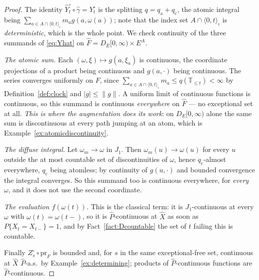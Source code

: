 \documentclass[11pt,a4paper]{article}
\theoremstyle{plain}
\theoremstyle{definition}
\theoremstyle{remark}
\newcommand{\T}{\mathbb{T}}                     %
\newcommand{\DE}{D_E[0,\infty)}
\begin{document}
\begin{proof}
  The identity $\hat{Y}^\circ_t \circ \hat\gamma = Y^\circ_t$ is the splitting
  $q = q_{\mathrm{a}} + q_{\mathrm{c}}$, the atomic integral being
  $\sum_{a \in A \cap \langle 0,t\rangle_\iota} m_a g(a,\omega(a))$; note that the
  index set $A \cap \langle 0,t\rangle_\iota$ is \emph{deterministic}, which is
  the whole point.  We check continuity of the three summands of
  \eqref{eq:Yhat} on $\hat{F} = \DE \times E^A$.

  \emph{The atomic sum.}  Each $(\omega,\xi) \mapsto g(a,\xi_a)$ is continuous, the
  coordinate projections of a product being continuous and $g(a,\cdot)$ being
  continuous.  The series converges uniformly on $\hat{F}$, since
  $\sum_{a \in A \cap \langle 0,t\rangle_\iota} m_a \leq q(\T_{\leq t}) < \infty$ by
  Definition~\ref{def:clock} and $|g| \leq \lVert g\rVert$.  A uniform limit of
  continuous functions is continuous, so this summand is continuous
  \emph{everywhere} on $\hat{F}$ --- no exceptional set at all.  \emph{This is
  where the augmentation does its work}: on $\DE$ alone the same sum is
  discontinuous at every path jumping at an atom, which is
  Example~\ref{ex:atomicdiscontinuity}.

  \emph{The diffuse integral.}  Let $\omega_m \to \omega$ in $J_1$.  Then
  $\omega_m(u) \to \omega(u)$ for every $u$ outside the at most countable set of
  discontinuities of $\omega$, hence $q_{\mathrm{c}}$-almost everywhere,
  $q_{\mathrm{c}}$ being atomless; by continuity of $g(u,\cdot)$ and bounded
  convergence the integral converges.  So this summand too is continuous
  everywhere, for \emph{every} $\omega$, and it does not use the second
  coordinate.

  \emph{The evaluation $f(\omega(t))$.}  This is the classical term: it is
  $J_1$-continuous at every $\omega$ with $\omega(t) = \omega(t-)$, so it is
  $\hat{P}$-continuous at $\hat{X}$ as soon as $P\{X_t = X_{t-}\} = 1$, and by
  Fact~\ref{fact:Dcountable} the set of $t$ failing this is countable.

  Finally $Z^\circ_s \circ \mathrm{pr}_F$ is bounded and, for $s$ in the same
  exceptional-free set, continuous at $\hat{X}$ $\hat{P}$-a.s.\ by
  Example~\ref{ex:determining}; products of $\hat{P}$-continuous functions are
  $\hat{P}$-continuous.
\end{proof}
\end{document}
